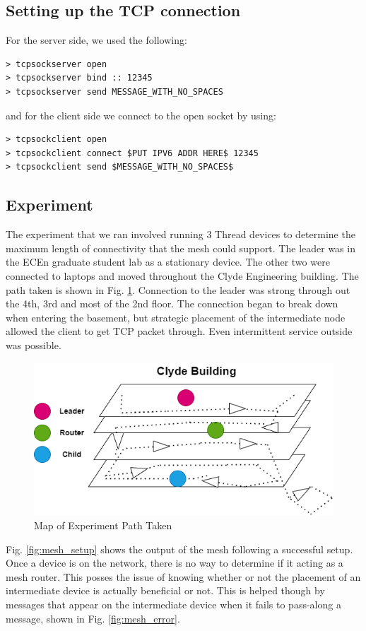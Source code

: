 \documentclass[letterpaper,twocolumn,10pt]{article}
\begin{document}
\subsection{Setting up the TCP connection}

For the server side, we used the following:
\begin{lstlisting}
> tcpsockserver open
> tcpsockserver bind :: 12345
> tcpsockserver send MESSAGE_WITH_NO_SPACES
\end{lstlisting}
and for the client side we connect to the open socket by using:
\begin{lstlisting}
> tcpsockclient open
> tcpsockclient connect $PUT IPV6 ADDR HERE$ 12345
> tcpsockclient send $MESSAGE_WITH_NO_SPACES$
\end{lstlisting}

\subsection{Experiment}

The experiment that we ran involved running 3 Thread devices to determine the maximum length of connectivity that the mesh could support. The leader was in the ECEn graduate student lab as a stationary device. The other two were connected to laptops and moved throughout the Clyde Engineering building. The path taken is shown in Fig. \ref{fig:clyde}. Connection to the leader was strong through out the 4th, 3rd and most of the 2nd floor. The connection began to break down when entering the basement, but strategic placement of the intermediate node allowed the client to get TCP packet through. Even intermittent service outside was possible. 

\begin{figure}[h]
    \centering
    \includegraphics[width=0.75\linewidth]{Figures/Clyde_Map.png}
    \caption{Map of Experiment Path Taken}
    \label{fig:clyde}
\end{figure}

Fig. \ref{fig:mesh_setup} shows the output of the mesh following a successful setup. Once a device is on the network, there is no way to determine if it acting as a mesh router. This posses the issue of knowing whether or not the placement of an intermediate device is actually beneficial or not. This is helped though by messages that appear on the intermediate device when it fails to pass-along a message, shown in Fig. \ref{fig:mesh_error}.
\end{document}
